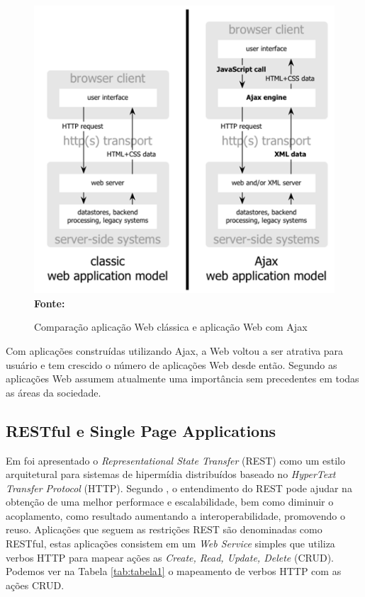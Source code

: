 \begin{figure}[!ht]
	\centering	
	\caption[\hspace{0.1cm}Comparação aplicação Web clássica e aplicação Web com Ajax.]{Comparação aplicação Web clássica e aplicação Web com Ajax}
	  \vspace{-0.4cm}
	\includegraphics[width=.6\textwidth]{figuras/ajax_comparison.png}
	 \vspace{-0.3cm}
	\\\textbf{\footnotesize Fonte: \cite{garrettAjax}}
	\label{fig:ajax_comparison}
\end{figure}


Com aplicações construídas utilizando Ajax, a Web voltou a ser atrativa para usuário e tem crescido o número de aplicações Web desde então. Segundo
\cite{tabulaRest} as aplicações Web assumem atualmente uma importância sem precedentes em todas as áreas da sociedade. 

\subsection{RESTful e Single Page Applications}
Em \cite{fieldingRest} foi apresentado o \textit{Representational State Transfer} (REST) como um estilo arquitetural para sistemas de hipermídia 
distribuídos baseado no \textit{HyperText Transfer Protocol} (HTTP). Segundo \cite{modelingRestful}, o entendimento do REST pode ajudar na obtenção 
de uma melhor performace e escalabilidade, bem como diminuir o acoplamento, como resultado aumentando a interoperabilidade, promovendo o reuso. 
Aplicações que seguem as restrições REST são denominadas como RESTful, estas aplicações consistem em um \textit{Web Service} simples que utiliza 
verbos HTTP para mapear ações as \textit{Create, Read, Update, Delete} (CRUD). Podemos ver na Tabela \ref{tab:tabela1} o mapeamento de verbos HTTP 
com as ações CRUD.

